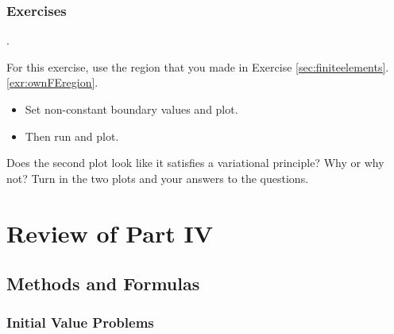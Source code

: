 
\subsection*{Exercises}

\begin{list}
{.}{}

\item 
For this exercise, use the region that you made in Exercise \ref{sec:finiteelements}.\ref{exr:ownFEregion}.
\begin{itemize}
	\item Set non-constant boundary values and plot.
	\item Then run  and plot.
\end{itemize}
Does the second plot look like it satisfies a variational principle? Why or why not?
Turn in the two plots and your answers to the questions.

\end{list}


\chapter*{Review of Part IV}
\section*{Methods and Formulas}


\subsection*{Initial Value Problems}

